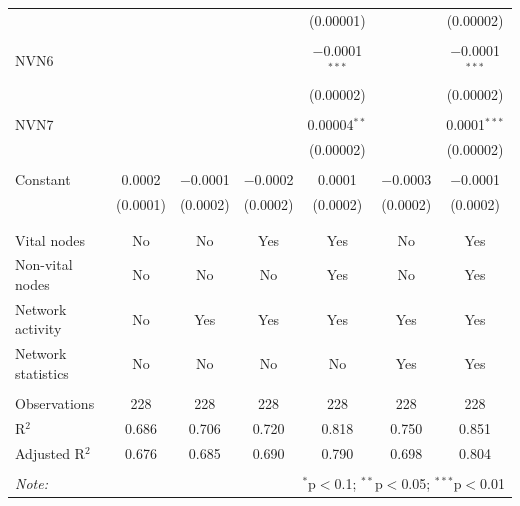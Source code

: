 \begin{table}[!htbp]
\begin{tabular}{@{\extracolsep{5pt}}lcccccc}
  &  &  &  & (0.00001) &  & (0.00002) \\ 
  & & & & & & \\ 
 NVN6 &  &  &  & $-$0.0001$^{***}$ &  & $-$0.0001$^{***}$ \\ 
  &  &  &  & (0.00002) &  & (0.00002) \\ 
  & & & & & & \\ 
 NVN7 &  &  &  & 0.00004$^{**}$ &  & 0.0001$^{***}$ \\ 
  &  &  &  & (0.00002) &  & (0.00002) \\ 
  & & & & & & \\ 
 Constant & 0.0002 & $-$0.0001 & $-$0.0002 & 0.0001 & $-$0.0003 & $-$0.0001 \\ 
  & (0.0001) & (0.0002) & (0.0002) & (0.0002) & (0.0002) & (0.0002) \\ 
  & & & & & & \\ 
\hline \\[-1.8ex] 
Vital nodes & No & No & Yes & Yes & No & Yes \\ 
Non-vital nodes & No & No & No & Yes & No & Yes \\ 
Network activity & No & Yes & Yes & Yes & Yes & Yes \\ 
Network statistics & No & No & No & No & Yes & Yes \\ 
\hline &  &  &  &  &  &  \\ 
Observations & 228 & 228 & 228 & 228 & 228 & 228 \\ 
R$^{2}$ & 0.686 & 0.706 & 0.720 & 0.818 & 0.750 & 0.851 \\ 
Adjusted R$^{2}$ & 0.676 & 0.685 & 0.690 & 0.790 & 0.698 & 0.804 \\ 
\hline 
\hline \\[-1.8ex] 
\textit{Note:}  & \multicolumn{6}{r}{$^{*}$p$<$0.1; $^{**}$p$<$0.05; $^{***}$p$<$0.01} \\ 
\end{tabular} 
\end{table} 

